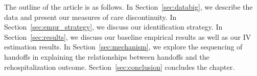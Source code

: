 \documentclass[final,12pt, notitlepage]{article}
\begin{document}
The outline of the article is as follows. In Section~\ref{sec:databig}, we describe the data and present our measures of care discontinuity. In Section~\ref{sec:empr_strategy}, we discuss our identification strategy. In Section~\ref{sec:results}, we discuss our baseline empirical results as well as our IV estimation results. In Section~\ref{sec:mechanism}, we explore the sequencing of handoffs in explaining the relationships between handoffs and the rehospitalization outcome. Section~\ref{sec:conclusion} concludes the chapter.





\end{document}
